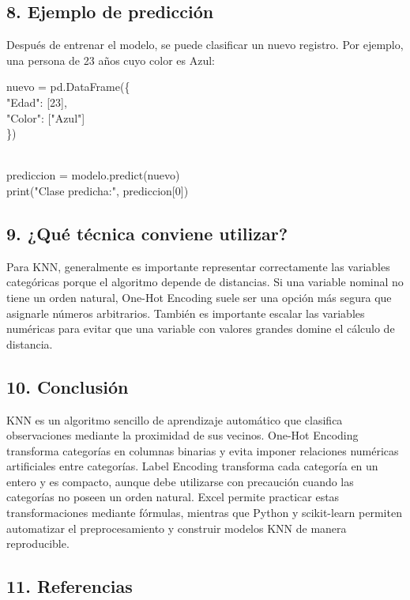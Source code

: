 \documentclass[]{article}
\begin{document}
\subsection{8. Ejemplo de predicción}\label{ejemplo-de-predicciuxf3n}

Después de entrenar el modelo, se puede clasificar un nuevo registro.
Por ejemplo, una persona de 23 años cuyo color es Azul:

nuevo = pd.DataFrame(\{\\
"Edad": {[}23{]},\\
"Color": {[}"Azul"{]}\\
\})\\
\strut \\
prediccion = modelo.predict(nuevo)\\
print("Clase predicha:", prediccion{[}0{]})

\subsection{9. ¿Qué técnica conviene
utilizar?}\label{quuxe9-tuxe9cnica-conviene-utilizar}

Para KNN, generalmente es importante representar correctamente las
variables categóricas porque el algoritmo depende de distancias. Si una
variable nominal no tiene un orden natural, One-Hot Encoding suele ser
una opción más segura que asignarle números arbitrarios. También es
importante escalar las variables numéricas para evitar que una variable
con valores grandes domine el cálculo de distancia.

\subsection{10. Conclusión}\label{conclusiuxf3n}

KNN es un algoritmo sencillo de aprendizaje automático que clasifica
observaciones mediante la proximidad de sus vecinos. One-Hot Encoding
transforma categorías en columnas binarias y evita imponer relaciones
numéricas artificiales entre categorías. Label Encoding transforma cada
categoría en un entero y es compacto, aunque debe utilizarse con
precaución cuando las categorías no poseen un orden natural. Excel
permite practicar estas transformaciones mediante fórmulas, mientras que
Python y scikit-learn permiten automatizar el preprocesamiento y
construir modelos KNN de manera reproducible.

\subsection{11. Referencias}\label{referencias-1}
\end{document}
